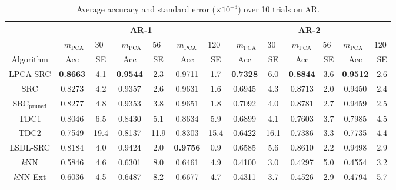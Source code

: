 \documentclass[review]{elsarticle}
\begin{document}
\begin{table}[!htb]
\small{
\centering
\begin{tabular}{|c|c|c|c|c|c|c|c|c|c|c|c|c|}
\hline
& \multicolumn{6}{|c|}{AR-1} & \multicolumn{6}{|c|}{AR-2} \\
\hline
& \multicolumn{2}{|c|}{$m_{\mathrm{PCA}} = 30$} & \multicolumn{2}{|c|}{$m_{\mathrm{PCA}} = 56$}  & \multicolumn{2}{|c|}{$m_{\mathrm{PCA}} = 120$}  & \multicolumn{2}{|c|}{$m_{\mathrm{PCA}} = 30$}  & \multicolumn{2}{|c|}{$m_{\mathrm{PCA}} = 56$} & \multicolumn{2}{|c|}{$m_{\mathrm{PCA}} = 120$}  \\
\hline
Algorithm & Acc & SE  & Acc & SE  &  Acc & SE  &  Acc & SE  &  Acc & SE &   Acc & SE   \\
\hline
LPCA-SRC	& \textbf{0.8663}	& 4.1	 & \textbf{0.9544}	& 2.3 & 0.9711	& 1.7 & \textbf{0.7328}	& 6.0 & \textbf{0.8844}	& 3.6 & \textbf{0.9512}	&  2.6 \\
SRC		& 0.8273	& 4.2		& 0.9357 &	2.6	& 0.9631		& 1.6 & 0.6945	&  4.3 & 0.8713	& 2.0 & 0.9450	& 2.4 \\
SRC$_\text{pruned}$ 	& 0.8277	& 4.8	&	0.9353	& 3.8 & 0.9651	& 1.8 & 0.7092	& 4.0 & 0.8781	& 2.7 & 0.9459	& 2.5\\
TDC1	&	0.8046	&	6.5		&	0.8430	&	5.1 &	0.8634	&	5.9	&	0.6899	&	4.1	&	0.7603	&	3.7 &	0.7985	&	4.5\\
TDC2		&	0.7549	&	19.4		&	0.8137	&	11.9	&	0.8303	&	15.4 & 0.6422	& 16.1 &	0.7386	&	3.3 &	0.7735	&	4.4 \\
LSDL-SRC		& 0.8184	& 4.0		&  0.9424	& 2.0 & \textbf{0.9756}	& 0.9 & 0.6585	& 5.6 & 0.8610	& 2.2 & 0.9498	& 2.9 \\
$k$NN 	& 0.5846	& 4.6	&  0.6301	& 8.0 & 0.6461	& 4.9 & 0.4100	& 3.0 & 0.4297	& 5.0 & 0.4554	& 3.2\\
$k$NN-Ext & 0.6036	& 4.5	&  0.6487	& 8.2 & 0.6677	& 4.7 & 0.4311	& 3.7 & 0.4526	& 2.9 & 0.4794	& 5.7  \\
\hline
\end{tabular}
\caption{Average accuracy and standard error ($\times 10^{-3}$) over 10 trials on AR.} 
\label{AR_results_acc}}
\end{table}
\end{document}
